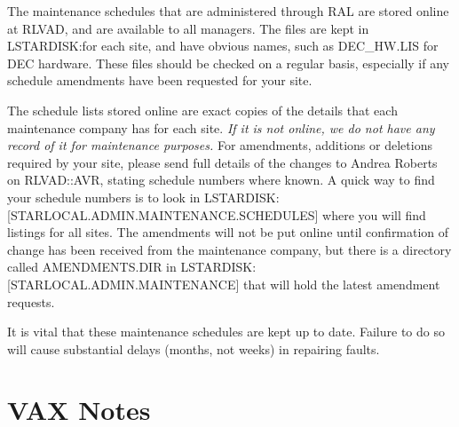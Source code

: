The maintenance schedules that are administered through RAL are stored 
online at RLVAD, and are available to all managers.
The files are kept in LSTARDISK:
for each site, and have obvious names, such as DEC\_HW.LIS for DEC hardware.
These files should be checked on a regular basis, especially if any schedule
amendments have been requested for your site. 

The schedule lists stored online are exact copies of the details that each 
maintenance company has for each site.
{\em If it is not online, we do not have any record of it for maintenance
purposes.}
For amendments, additions or deletions required by your site, please send full
details of the changes to Andrea Roberts on RLVAD::AVR, stating schedule numbers
where known.
A quick way to find your schedule numbers is to look in 
LSTARDISK:[STARLOCAL.ADMIN.MAINTENANCE.SCHEDULES] where you will find 
listings for all sites.
The amendments will not be put online until confirmation of change has been
received from the maintenance company, but there is a directory called
AMENDMENTS.DIR in LSTARDISK:[STARLOCAL.ADMIN.MAINTENANCE] that will hold the
latest amendment requests.

It is vital that these maintenance schedules are kept up to date.
Failure to do so will cause substantial delays (months, not weeks) in repairing
faults.

\section {VAX Notes}

